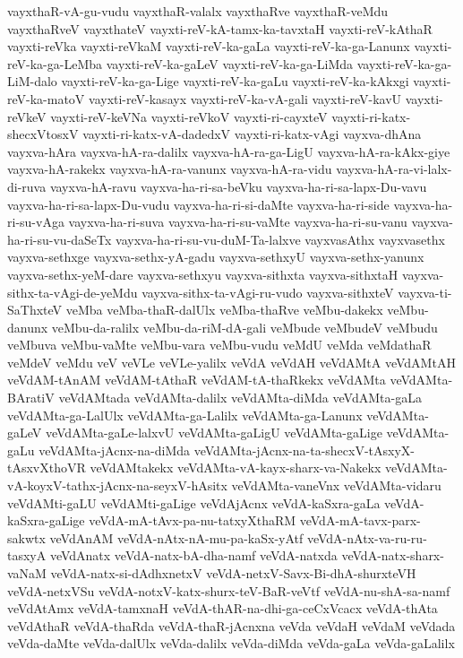 {vayxthaR-vA-gu-vudu
vayxthaR-valalx
vayxthaRve
vayxthaR-veMdu
vayxthaRveV
vayxthateV
vayxti-reV-kA-tamx-ka-tavxtaH
vayxti-reV-kAthaR
vayxti-reVka
vayxti-reVkaM
vayxti-reV-ka-gaLa
vayxti-reV-ka-ga-Lanunx
vayxti-reV-ka-ga-LeMba
vayxti-reV-ka-gaLeV
vayxti-reV-ka-ga-LiMda
vayxti-reV-ka-ga-LiM-dalo
vayxti-reV-ka-ga-Lige
vayxti-reV-ka-gaLu
vayxti-reV-ka-kAkxgi
vayxti-reV-ka-matoV
vayxti-reV-kasayx
vayxti-reV-ka-vA-gali
vayxti-reV-kavU
vayxti-reVkeV
vayxti-reV-keVNa
vayxti-reVkoV
vayxti-ri-cayxteV
vayxti-ri-katx-shecxVtosxV
vayxti-ri-katx-vA-dadedxV
vayxti-ri-katx-vAgi
vayxva-dhAna
vayxva-hAra
vayxva-hA-ra-dalilx
vayxva-hA-ra-ga-LigU
vayxva-hA-ra-kAkx-giye
vayxva-hA-rakekx
vayxva-hA-ra-vanunx
vayxva-hA-ra-vidu
vayxva-hA-ra-vi-lalx-di-ruva
vayxva-hA-ravu
vayxva-ha-ri-sa-beVku
vayxva-ha-ri-sa-lapx-Du-vavu
vayxva-ha-ri-sa-lapx-Du-vudu
vayxva-ha-ri-si-daMte
vayxva-ha-ri-side
vayxva-ha-ri-su-vAga
vayxva-ha-ri-suva
vayxva-ha-ri-su-vaMte
vayxva-ha-ri-su-vanu
vayxva-ha-ri-su-vu-daSeTx
vayxva-ha-ri-su-vu-duM-Ta-lalxve
vayxvasAthx
vayxvasethx
vayxva-sethxge
vayxva-sethx-yA-gadu
vayxva-sethxyU
vayxva-sethx-yanunx
vayxva-sethx-yeM-dare
vayxva-sethxyu
vayxva-sithxta
vayxva-sithxtaH
vayxva-sithx-ta-vAgi-de-yeMdu
vayxva-sithx-ta-vAgi-ru-vudo
vayxva-sithxteV
vayxva-ti-SaThxteV
veMba
veMba-thaR-dalUlx
veMba-thaRve
veMbu-dakekx
veMbu-danunx
veMbu-da-ralilx
veMbu-da-riM-dA-gali
veMbude
veMbudeV
veMbudu
veMbuva
veMbu-vaMte
veMbu-vara
veMbu-vudu
veMdU
veMda
veMdathaR
veMdeV
veMdu
veV
veVLe
veVLe-yalilx
veVdA
veVdAH
veVdAMtA
veVdAMtAH
veVdAM-tAnAM
veVdAM-tAthaR
veVdAM-tA-thaRkekx
veVdAMta
veVdAMta-BAratiV
veVdAMtada
veVdAMta-dalilx
veVdAMta-diMda
veVdAMta-gaLa
veVdAMta-ga-LalUlx
veVdAMta-ga-Lalilx
veVdAMta-ga-Lanunx
veVdAMta-gaLeV
veVdAMta-gaLe-lalxvU
veVdAMta-gaLigU
veVdAMta-gaLige
veVdAMta-gaLu
veVdAMta-jAcnx-na-diMda
veVdAMta-jAcnx-na-ta-shecxV-tAsxyX-tAsxvXthoVR
veVdAMtakekx
veVdAMta-vA-kayx-sharx-va-Nakekx
veVdAMta-vA-koyxV-tathx-jAcnx-na-seyxV-hAsitx
veVdAMta-vaneVnx
veVdAMta-vidaru
veVdAMti-gaLU
veVdAMti-gaLige
veVdAjAcnx
veVdA-kaSxra-gaLa
veVdA-kaSxra-gaLige
veVdA-mA-tAvx-pa-nu-tatxyXthaRM
veVdA-mA-tavx-parx-sakwtx
veVdAnAM
veVdA-nAtx-nA-mu-pa-kaSx-yAtf
veVdA-nAtx-va-ru-ru-tasxyA
veVdAnatx
veVdA-natx-bA-dha-namf
veVdA-natxda
veVdA-natx-sharx-vaNaM
veVdA-natx-si-dAdhxnetxV
veVdA-netxV-Savx-Bi-dhA-shurxteVH
veVdA-netxVSu
veVdA-notxV-katx-shurx-teV-BaR-veVtf
veVdA-nu-shA-sa-namf
veVdAtAmx
veVdA-tamxnaH
veVdA-thAR-na-dhi-ga-ceCxVcacx
veVdA-thAta
veVdAthaR
veVdA-thaRda
veVdA-thaR-jAcnxna
veVda
veVdaH
veVdaM
veVdada
veVda-daMte
veVda-dalUlx
veVda-dalilx
veVda-diMda
veVda-gaLa
veVda-gaLalilx
}
